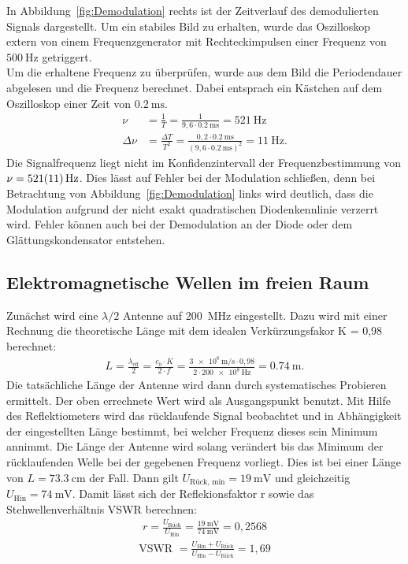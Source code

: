 \documentclass[a4paper,twoside,final]{article}
\begin{document}
In Abbildung~\ref{fig:Demodulation} rechts ist der Zeitverlauf des demodulierten Signals dargestellt. Um ein stabiles Bild zu erhalten, wurde das Oszilloskop extern von einem Frequenzgenerator mit Rechteckimpulsen einer Frequenz von $\SI{500}{\hertz}$ getriggert.\\
Um die erhaltene Frequenz zu überprüfen, wurde aus dem Bild die Periodendauer abgelesen und die Frequenz berechnet. Dabei entsprach ein Kästchen auf dem Oszilloskop einer Zeit von $\SI{0,2}{\milli\second}$.
\begin{align}
  \nu &= \frac{1}{T} = \frac{1}{9,6\cdot \SI{0,2}{\milli\second}} = \SI{521}{\hertz}\\
  \Delta \nu &= \frac{\Delta T}{T^2} = \frac{0,2\cdot \SI{0,2}{\milli\second}}{(9,6\cdot \SI{0,2}{\milli\second})^2} = \SI{11}{\hertz}.
\end{align}
Die Signalfrequenz liegt nicht im Konfidenzintervall der Frequenzbestimmung von $\nu = \SI{521\pm 11}{\hertz}$. Dies lässt auf Fehler bei der Modulation schließen, denn bei Betrachtung von Abbildung~\ref{fig:Demodulation} links wird deutlich, dass die Modulation aufgrund der nicht exakt quadratischen Diodenkennlinie verzerrt wird. Fehler können auch bei der Demodulation an der Diode oder dem Glättungskondensator entstehen.

\subsection{Elektromagnetische Wellen im freien Raum}
Zunächst wird eine $\lambda/2$ Antenne auf \SI{200}{\mega\hertz} eingestellt. Dazu wird mit einer Rechnung die theoretische Länge mit dem idealen Verkürzungsfakor K = 0,98 berechnet:
\begin{align}
L = \frac{\lambda_\text{eff}}{2} = \frac{c_0 \cdot K}{2 \cdot f} = \frac{\SI{3e8}{\metre\per\second} \cdot 0,98}{2 \cdot \SI{200e8}{\hertz}}  = \SI{0,74}{\metre}.
\end{align}
Die tatsächliche Länge der Antenne wird dann durch systematisches Probieren ermittelt. Der oben errechnete Wert wird als Ausgangspunkt benutzt. Mit Hilfe des Reflektiometers wird das rücklaufende Signal beobachtet und in Abhängigkeit der eingestellten Länge bestimmt, bei welcher Frequenz dieses sein Minimum annimmt. Die Länge der Antenne wird solang verändert bis das Minimum der rücklaufenden Welle bei der gegebenen Frequenz vorliegt. Dies ist bei einer Länge von $L = \SI{73,3}{\centi\metre}$ der Fall. Dann gilt $U_\text{Rück, min} = \SI{19}{\milli\volt}$ und gleichzeitig $U_\text{Hin} = \SI{74}{\milli\volt}$. Damit lässt sich der Reflekionsfaktor r sowie das Stehwellenverhältnis VSWR berechnen:
\begin{align}
r = \frac{U_\text{Rück}}{U_\text{Hin}} = \frac{\SI{19}{\milli\volt}}{\SI{74}{\milli\volt}} = 0,2568
\end{align}
\begin{align}
\text{VSWR } = \frac{U_\text{Hin}+U_\text{Rück}}{U_\text{Hin}-U_\text{Rück}} = 1,69
\end{align}
\end{document}
